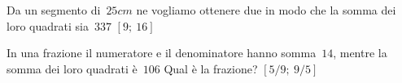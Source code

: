 \begin{multicols}{2}
\begin{esercizio}[\Ast]
 \label{ese:3.126}
Da un segmento di~\(25\unit{cm}\) ne vogliamo ottenere due in modo che la 
somma 
dei loro quadrati sia~\(337\)
\hfill\(\left[9;~16\right]\)
\end{esercizio}

\begin{esercizio}[\Ast]
 \label{ese:3.127}
In una frazione il numeratore e il denominatore hanno somma~\(14\), mentre 
la
somma dei loro quadrati è~\(106\) Qual è la frazione?
\hfill\(\left[5/9;~9/5\right]\)
\end{esercizio}

\begin{comment}

\begin{esercizio}[\Ast]
 \label{ese:3.128}
Due navi partono contemporaneamente da uno stesso porto e arrivano alla
stessa destinazione dopo aver percorso sulla stessa rotta a velocità
costante~\(720\unit{miglia}\) Sapendo che una delle due navi viaggia con 
una 
velocità
di 1 nodo (1 miglio all'ora) superiore a quella dell'altra nave e che 
perciò
arriva 3 ore prima a destinazione, determina le velocità in nodi delle due
navi.
\hfill\(\left[15;~16\right]\)
\end{esercizio}

\begin{esercizio}
 \label{ese:3.129}
Due navi che viaggiano su rotte perpendicolari a velocità costante si
incontrano in mare aperto. Sapendo che una delle navi viaggia a 15 nodi (1
nodo = 1 miglio all'ora), dopo quanto tempo le due navi si trovano alla
distanza di 40 miglia?
\hfill\(\left[...\right]\)
\end{esercizio}

\begin{esercizio}
 \label{ese:3.130}
Luca e Carlo bevono due aranciate in bottiglia. Nel tempo in cui Luca beve
11 sorsi, Carlo ne beve 8, ma due sorsi di Carlo equivalgono a tre di 
Luca.
Quando Carlo inizia a bere Luca ha già preso 4 sorsi. Dopo quanti sorsi di
Carlo le due bibite hanno lo stesso livello?
\hfill\(\left[...\right]\)
\end{esercizio}

\begin{esercizio}
 \label{ese:3.131}
Un maratoneta durante un allenamento fa due giri di un percorso 
di~\(22\unit{km} 
\)
mantenendo in ciascun giro una velocità costante ma nel secondo giro la
velocità è inferiore di~\(0,5\unit{km/h}\) rispetto al primo giro. A 
quali 
velocità
ha corso se ha impiegato complessivamente 2 ore e un quarto?
\hfill\(\left[...\right]\)
\end{esercizio}


\end{comment}
\end{multicols}
